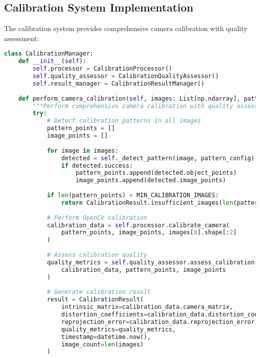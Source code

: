 \documentclass[11pt,a4paper]{report}
\begin{document}
\subsection{Calibration System Implementation}

The calibration system provides comprehensive camera calibration with quality assessment:

\begin{lstlisting}[language=Python]
class CalibrationManager:
    def __init__(self):
        self.processor = CalibrationProcessor()
        self.quality_assessor = CalibrationQualityAssessor()
        self.result_manager = CalibrationResultManager()
        
    def perform_camera_calibration(self, images: List[np.ndarray], pattern_config: PatternConfig) -> CalibrationResult:
        """Perform comprehensive camera calibration with quality assessment."""
        try:
            # Detect calibration patterns in all images
            pattern_points = []
            image_points = []
            
            for image in images:
                detected = self._detect_pattern(image, pattern_config)
                if detected.success:
                    pattern_points.append(detected.object_points)
                    image_points.append(detected.image_points)
            
            if len(pattern_points) < MIN_CALIBRATION_IMAGES:
                return CalibrationResult.insufficient_images(len(pattern_points))
            
            # Perform OpenCV calibration
            calibration_data = self.processor.calibrate_camera(
                pattern_points, image_points, images[0].shape[:2]
            )
            
            # Assess calibration quality
            quality_metrics = self.quality_assessor.assess_calibration(
                calibration_data, pattern_points, image_points
            )
            
            # Generate calibration result
            result = CalibrationResult(
                intrinsic_matrix=calibration_data.camera_matrix,
                distortion_coefficients=calibration_data.distortion_coefficients,
                reprojection_error=calibration_data.reprojection_error,
                quality_metrics=quality_metrics,
                timestamp=datetime.now(),
                image_count=len(images)
            )
            

\end{lstlisting}
\end{document}
